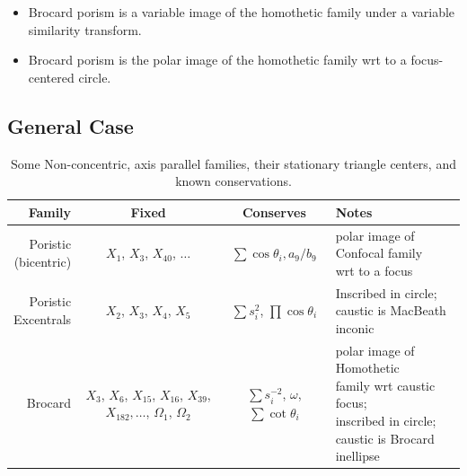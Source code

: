\begin{itemize}
    \item Brocard porism is a variable image of the homothetic family under a variable similarity transform.
    \item Brocard porism is the polar image of the homothetic family wrt to a focus-centered circle.
\end{itemize}

\subsection{General Case}

\begin{table}
\centering
\begin{tabular}{|r|c|c|l|}
\hline
Family & Fixed & Conserves & Notes \\
\hline
\makecell[rc]{Poristic\\(bicentric)} & $X_1$, $X_3$, $X_{40}$, $\ldots$ & $\sum\cos\theta_i,a_9/b_9$ & \makecell[lc]{polar image of Confocal family\\wrt to a focus} \\
\hline
\makecell[rt]{Poristic\\Excentrals} & $X_2$, $X_3$, $X_4$, $X_5$ & $\sum{s_i^2}$, $\prod\cos\theta_i$ & \makecell[lt]{Inscribed in circle;\\caustic is MacBeath inconic} \\
\hline
Brocard & \makecell[lc]{$X_3$, $X_6$, $X_{15}$, $X_{16}$,\\$X_{39}$, $X_{182},\ldots$,\\$\Omega_1$, $\Omega_2$} & $\sum{s_i^{-2}}$, $\omega$, $\sum\cot\theta_i$ & \makecell[lc]{polar image of Homothetic\\family wrt caustic focus;\\inscribed in circle;\\caustic is Brocard inellipse}\\
\hline
\end{tabular}
\caption{Some Non-concentric, axis parallel families, their stationary triangle centers, and known conservations.}
\label{tab:n3-non-conc-families}
\end{table}
